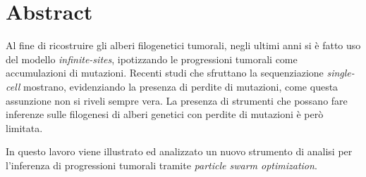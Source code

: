 \newpage
\cleardoublepage
\begingroup
\let\clearpage\endgroup
\null{}
\chapter*{\centering Abstract}

Al fine di ricostruire gli alberi filogenetici tumorali, negli ultimi anni si è fatto uso del modello \textit{infinite-sites}, ipotizzando le progressioni tumorali come accumulazioni di mutazioni. Recenti studi che sfruttano la sequenziazione \textit{single-cell} mostrano, evidenziando la presenza di perdite di mutazioni, come questa assunzione non si riveli sempre vera. La presenza di strumenti che possano fare inferenze sulle filogenesi di alberi genetici con perdite di mutazioni è però limitata.

In questo lavoro viene illustrato ed analizzato un nuovo strumento di analisi per l'inferenza di progressioni tumorali tramite \textit{particle swarm optimization}.

 \null